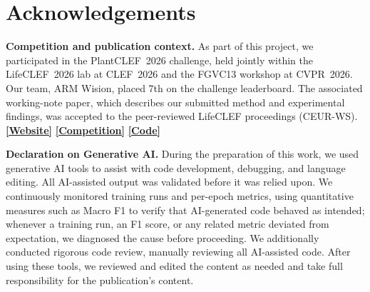 \chapter*{Acknowledgements}

\textbf{Competition and publication context.} As part of this project, we participated in the PlantCLEF~2026 challenge, held jointly within the LifeCLEF~2026 lab at CLEF~2026 and the FGVC13 workshop at CVPR~2026. Our team, ARM Wision, placed 7th on the challenge leaderboard. The associated working-note paper, which describes our submitted method and experimental findings, was accepted to the peer-reviewed LifeCLEF proceedings (CEUR-WS).
\href{https://arm-wision.github.io/}{\textbf{[Website]}}
\href{https://www.kaggle.com/competitions/plantclef-2026/leaderboard}{\textbf{[Competition]}}
\href{https://example.com/code}{\textbf{[Code]}}

\textbf{Declaration on Generative AI.}
During the preparation of this work, we used generative AI tools to
assist with code development, debugging, and language editing. All AI-assisted
output was validated before it was relied upon. We continuously monitored
training runs and per-epoch metrics, using quantitative measures such as
Macro F1 to verify that AI-generated code behaved as intended; whenever
a training run, an F1 score, or any related metric deviated from expectation, we
diagnosed the cause before proceeding. We additionally conducted rigorous code
review, manually reviewing all AI-assisted code. After using these tools, we
reviewed and edited the content as needed and take full responsibility
for the publication's content.
